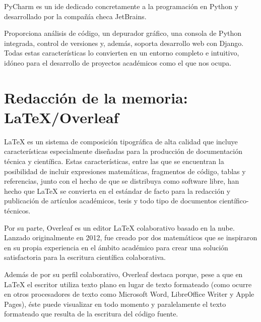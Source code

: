 \documentclass[a4paper, 12pt]{book}
\begin{document}

PyCharm es un \gls{ide} dedicado concretamente a la programación en Python y desarrollado por la compañía checa JetBrains.

Proporciona análisis de código, un depurador gráfico, una consola de Python integrada, control de versiones y, además, soporta desarrollo web con Django. Todas estas características lo convierten en un entorno completo e intuitivo, idóneo para el desarrollo de proyectos académicos como el que nos ocupa.


\section{Redacción de la memoria: LaTeX/Overleaf}
\label{sec:redaccion_de_la_memoria}

LaTeX es un sistema de composición tipográfica de alta calidad que incluye características especialmente diseñadas para la producción de documentación técnica y científica. Estas características, entre las que se encuentran la posibilidad de incluir expresiones matemáticas, fragmentos de código, tablas y referencias, junto con el hecho de que se distribuya como software libre, han hecho que LaTeX se convierta en el estándar de facto para la redacción y publicación de artículos académicos, tesis y todo tipo de documentos científico-técnicos. 

Por su parte, Overleaf es un editor LaTeX colaborativo basado en la nube. Lanzado originalmente en 2012, fue creado por dos matemáticos que se inspiraron en su propia experiencia en el ámbito académico para crear una solución satisfactoria para la escritura científica colaborativa.

Además de por su perfil colaborativo, Overleaf destaca porque, pese a que en LaTeX el escritor utiliza texto plano en lugar de texto formateado (como ocurre en otros procesadores de texto como Microsoft Word, LibreOffice Writer y Apple Pages), éste puede visualizar en todo momento y paralelamente el texto formateado que resulta de la escritura del código fuente.

\cleardoublepage

\end{document}
